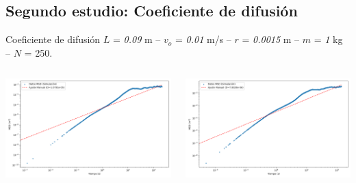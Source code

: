 \documentclass{beamer}
\begin{document}
\subsection{Segundo estudio: Coeficiente de difusión}
\begin{frame}{Coeficiente de difusión}
  \tiny {} $L$ = \textit{0.09} m -- $v_o$ = \textit{0.01} m/s -- $r$ = \textit{0.0015} m -- $m$ = \textit{1} kg -- $N$ = 250.
  \begin{columns}
    \begin{column}{0.50\textwidth}
      \includegraphics[width=1.10\linewidth]{photoMaterial/MSD_09.png}
    \end{column}
    \begin{column}{0.50\textwidth}
      \includegraphics[width=1.10\linewidth]{photoMaterial/MSD_03.png}
    \end{column}
  \end{columns}
\end{frame}
\end{document}
